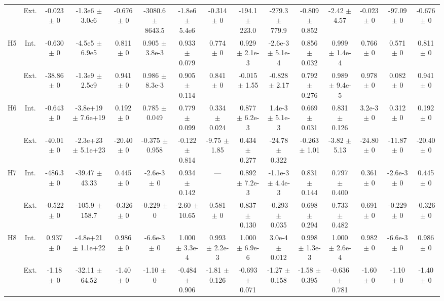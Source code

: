 \begin{table}[htbp]
{\begin{tabular}{@{}ccccccccccccccc@{}}
 & Ext. & -0.023 $\pm$ 0 & -1.3e6 $\pm$ 3.0e6 & -0.676 $\pm$ 0 & -3080.6 $\pm$ 8643.5 & -1.8e6 $\pm$ 5.4e6 & -0.314 $\pm$ 0 & -194.1 $\pm$ 223.0 & -279.3 $\pm$ 779.9 & -0.809 $\pm$ 0.852 & -2.42 $\pm$ 4.57 & -0.023 $\pm$ 0 & -97.09 $\pm$ 0 & -0.676 $\pm$ 0 \\
\cline{2-15}
\multirow{2}{*}{H5} & Int. & -0.630 $\pm$ 0 & -4.5e5 $\pm$ 6.9e5 & 0.811 $\pm$ 0 & 0.905 $\pm$ 3.8e-3 & 0.933 $\pm$ 0.079 & 0.774 $\pm$ 0 & 0.929 $\pm$ 2.1e-3 & -2.6e-3 $\pm$ 5.1e-4 & 0.856 $\pm$ 0.032 & 0.999 $\pm$ 1.4e-4 & 0.766 $\pm$ 0 & 0.571 $\pm$ 0 & 0.811 $\pm$ 0 \\
 & Ext. & -38.86 $\pm$ 0 & -1.3e9 $\pm$ 2.5e9 & 0.941 $\pm$ 0 & 0.986 $\pm$ 8.3e-3 & 0.905 $\pm$ 0.114 & 0.841 $\pm$ 0 & -0.015 $\pm$ 1.55 & -0.828 $\pm$ 2.17 & 0.792 $\pm$ 0.276 & 0.989 $\pm$ 9.4e-5 & 0.978 $\pm$ 0 & 0.082 $\pm$ 0 & 0.941 $\pm$ 0 \\
\cline{2-15}
\multirow{2}{*}{H6} & Int. & -0.643 $\pm$ 0 & -3.8e+19 $\pm$ 7.6e+19 & 0.192 $\pm$ 0 & 0.785 $\pm$ 0.049 & 0.779 $\pm$ 0.099 & 0.334 $\pm$ 0.024 & 0.877 $\pm$ 6.2e-3 & 1.4e-3 $\pm$ 5.1e-3 & 0.669 $\pm$ 0.031 & 0.831 $\pm$ 0.126 & 3.2e-3 $\pm$ 0 & 0.312 $\pm$ 0 & 0.192 $\pm$ 0 \\
 & Ext. & -40.01 $\pm$ 0 & -2.3e+23 $\pm$ 5.1e+23 & -20.40 $\pm$ 0 & -0.375 $\pm$ 0.958 & -0.122 $\pm$ 0.814 & -9.75 $\pm$ 1.85 & 0.434 $\pm$ 0.277 & -24.78 $\pm$ 0.322 & -0.263 $\pm$ 1.01 & -3.82 $\pm$ 5.13 & -24.80 $\pm$ 0 & -11.87 $\pm$ 0 & -20.40 $\pm$ 0 \\
\cline{2-15}
\multirow{2}{*}{H7} & Int. & -486.3 $\pm$ 0 & -39.47 $\pm$ 43.33 & 0.445 $\pm$ 0 & -2.6e-3 $\pm$ 0 & 0.934 $\pm$ 0.142 & --- & 0.892 $\pm$ 7.2e-3 & -1.1e-3 $\pm$ 4.4e-3 & 0.831 $\pm$ 0.144 & 0.797 $\pm$ 0.400 & 0.361 $\pm$ 0 & -2.6e-3 $\pm$ 0 & 0.445 $\pm$ 0 \\
 & Ext. & -0.522 $\pm$ 0 & -105.9 $\pm$ 158.7 & -0.326 $\pm$ 0 & -0.229 $\pm$ 0 & -2.60 $\pm$ 10.65 & 0.581 $\pm$ 0 & 0.837 $\pm$ 0.130 & -0.293 $\pm$ 0.035 & 0.698 $\pm$ 0.294 & 0.733 $\pm$ 0.482 & 0.691 $\pm$ 0 & -0.229 $\pm$ 0 & -0.326 $\pm$ 0 \\
\cline{2-15}
\multirow{2}{*}{H8} & Int. & 0.937 $\pm$ 0 & -4.8e+21 $\pm$ 1.1e+22 & 0.986 $\pm$ 0 & -6.6e-3 $\pm$ 0 & 1.000 $\pm$ 3.3e-4 & 0.993 $\pm$ 2.2e-3 & 1.000 $\pm$ 6.9e-6 & 3.0e-4 $\pm$ 0.012 & 0.998 $\pm$ 1.3e-3 & 1.000 $\pm$ 2.6e-4 & 0.982 $\pm$ 0 & -6.6e-3 $\pm$ 0 & 0.986 $\pm$ 0 \\
 & Ext. & -1.18 $\pm$ 0 & -32.11 $\pm$ 64.52 & -1.40 $\pm$ 0 & -1.10 $\pm$ 0 & -0.484 $\pm$ 0.906 & -1.81 $\pm$ 0.126 & -0.693 $\pm$ 0.071 & -1.27 $\pm$ 0.158 & -1.58 $\pm$ 0.395 & -0.636 $\pm$ 0.781 & -1.60 $\pm$ 0 & -1.10 $\pm$ 0 & -1.40 $\pm$ 0 \\

\end{tabular}}
\end{table}
